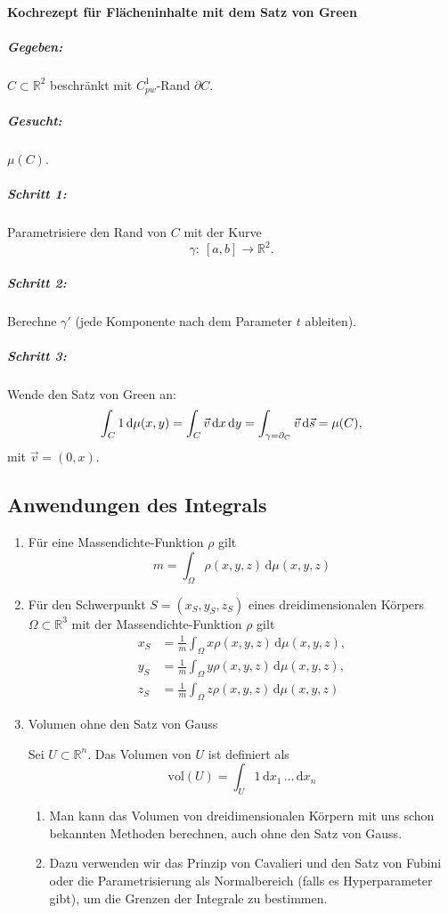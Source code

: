 \documentclass[a4paper,10pt]{article}
\def\R{\mathbb{R}}
\begin{document}
\paragraph{Kochrezept für Flächeninhalte mit dem Satz von Green}
\subparagraph{Gegeben:} \( C \subset \R^2 \) beschränkt mit \( C^1_{pw} \)-Rand \( \partial C \).
\subparagraph{Gesucht:} \( \mu(C) \).
\subparagraph{Schritt 1:} Parametrisiere den Rand von \( C \) mit der Kurve \[
    \gamma: \: [a, b] \to \R^2 \text{.}
\]
\subparagraph{Schritt 2:} Berechne \( \gamma' \) (jede Komponente nach dem Parameter \( t \) ableiten).
\subparagraph{Schritt 3:} Wende den Satz von Green an:
\[
    \int_C 1 \odif{{\mu(x, y)}} = \int_C \vec{v} \odif{x, y} = \int_{\gamma = \pdif{C}} \vec{v} \odif{\vec{s}} = \mu(C) \text{,}
\] mit \( \vec{v} = (0, x) \).

\subsection{Anwendungen des Integrals}
\begin{enumerate}
    \item Für eine Massendichte-Funktion \(\rho \) gilt
    \[
        m = \int_\Omega \rho(x, y, z) \, \mathrm{d}\mu(x, y, z)
    \]
    \item Für den Schwerpunkt \( S = (x_S, y_S, z_S) \) eines dreidimensionalen Körpers \( \Omega \subset \R^3 \) mit der Massendichte-Funktion \( \rho \) gilt
    \begin{align*}
        x_S &= \frac{1}{m} \int_\Omega x \rho(x, y, z) \, \mathrm{d}\mu(x, y, z), \\
        y_S &= \frac{1}{m} \int_\Omega y \rho(x, y, z) \, \mathrm{d}\mu(x, y, z), \\
        z_S &= \frac{1}{m} \int_\Omega z \rho(x, y, z) \, \mathrm{d}\mu(x, y, z)
    \end{align*}
    \item Volumen ohne den Satz von Gauss
    \begin{subbox}{}
        Sei \( U \subset \R^n \). Das Volumen von \( U \) ist definiert als
        \[
            \mathrm{vol}(U) = \int_U 1 \, \mathrm{d}x_1 \, \dots \, \mathrm{d}x_n
        \]
    \end{subbox}
    \begin{enumerate}
        \item Man kann das Volumen von dreidimensionalen Körpern mit uns schon bekannten Methoden berechnen, auch ohne den Satz von Gauss.
        \item Dazu verwenden wir das Prinzip von Cavalieri und den Satz von Fubini oder die Parametrisierung als Normalbereich (falls es Hyperparameter gibt), um die Grenzen der Integrale zu bestimmen.
    \end{enumerate}
\end{enumerate}
\end{document}

